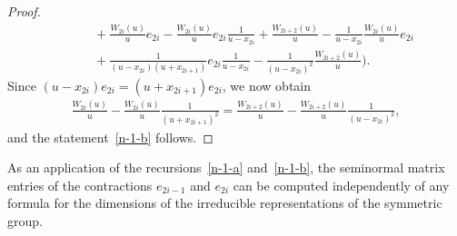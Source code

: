 \documentclass[11pt,a4paper,reqno,svgnames]{amsart}
\theoremstyle{plain}
\theoremstyle{definition}
\numberwithin{equation}{section}
\begin{document}
\begin{proof}
\begin{align*}
&\qquad +\frac{W_{2i}(u)}{u}e_{2i}-\frac{W_{2i}(u)}{u}e_{2i}\frac{1}{u-x_{2i}}+\frac{W_{2i+2}(u)}{u}
-\frac{1}{u-x_{2i}}\frac{W_{2i}(u)}{u}e_{2i}\\
&\qquad +\frac{1}{(u-x_{2i})(u+x_{2i+1})}e_{2i}\frac{1}{u-x_{2i}}
-\frac{1}{(u-x_{2i})^2}\frac{W_{2i+2}(u)}{u}
\bigg).
\end{align*}
Since $(u-x_{2i})e_{2i}=(u+x_{2i+1})e_{2i}$, we now obtain
\begin{align*}
\frac{W_{2i}(u)}{u}
-\frac{W_{2i}(u)}{u}\frac{1}{(u+x_{2i+1})^2}=
\frac{W_{2i+2}(u)}{u}
-\frac{W_{2i+2}(u)}{u}\frac{1}{(u-x_{2i})^2},
\end{align*}
and the statement~\eqref{n-1-b} follows. 
\end{proof}
As an application of the recursions~\eqref{n-1-a} and~\eqref{n-1-b}, the seminormal matrix entries of the contractions $e_{2i-1}$ and $e_{2i}$ can be computed independently of any formula for the dimensions of the irreducible representations of the symmetric group. 
\end{document}
